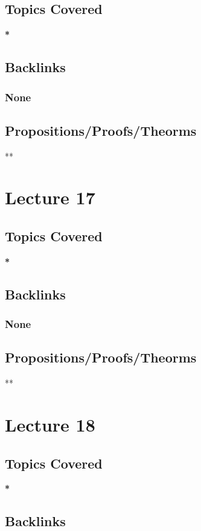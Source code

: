 \documentclass[11pt]{article}
\begin{document}
\subsection*{Topics Covered}
\label{sec:org3aab43c}
\textbf{*}
\subsection*{Backlinks}
\label{sec:org7eb5614}
\subsubsection*{None}
\label{sec:org3c6a9fc}
\subsection*{Propositions/Proofs/Theorms}
\label{sec:org225fc69}
**

\section*{Lecture 17}
\label{sec:org2dcdd64}
\subsection*{Topics Covered}
\label{sec:orgf1d7af3}
\textbf{*}
\subsection*{Backlinks}
\label{sec:orgd8132ee}
\subsubsection*{None}
\label{sec:org6a0905a}
\subsection*{Propositions/Proofs/Theorms}
\label{sec:org64af50d}
**

\section*{Lecture 18}
\label{sec:orgaf7c612}
\subsection*{Topics Covered}
\label{sec:org5005c40}
\textbf{*}
\subsection*{Backlinks}
\label{sec:orga24351f}
\end{document}
